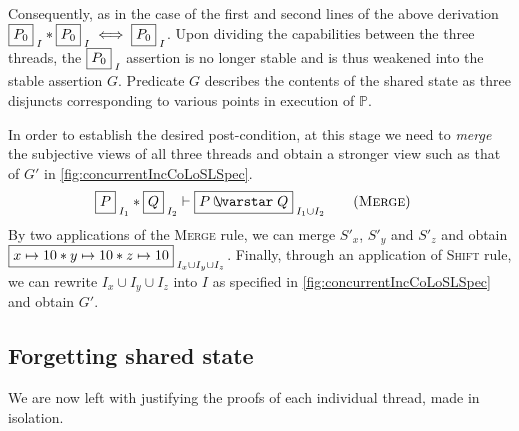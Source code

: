 Consequently, as in the case of the first and second lines of the
above derivation $\shared{P_0}{I} * \shared{P_0}{I} \iff
\shared{P_0}{I}$. Upon dividing the capabilities between the three
threads, the $\shared{P_0}{I}$ assertion is no longer stable and is
thus weakened into the stable assertion $G$. Predicate $G$ describes
the contents of the shared state as three disjuncts corresponding to
various points in execution of $\mathbb{P}$.


In order to establish the desired post-condition, at this stage we
need to \emph{merge} the subjective views of all three threads and
obtain a stronger view such as that of $G'$ in
\fig\ref{fig:concurrentIncCoLoSLSpec}.
\begin{align*}
  \label{eq:merge}
  \shared{P}{I_1} * \shared{Q}{I_2} &\vdash \shared{P \sepish Q}{I_1 \cup I_2} \tag{\textsc{Merge}}
\end{align*}
By two applications of the \textsc{Merge} rule, we can merge $S'_x$,
$S'_y$ and $S'_z$ and obtain $\shared{\cell{x}{10} * \cell{y}{10} *
  \cell{z}{10}}{I_x \cup I_y \cup I_z}$. Finally, through an
application of \textsc{Shift} rule, we can rewrite $I_x \cup I_y \cup
I_z$ into $I$ as specified in \fig\ref{fig:concurrentIncCoLoSLSpec}
and obtain $G'$.



\subsection{Forgetting shared state}
\label{subsec:hide}

We are now left with justifying the proofs of each individual thread,
made in isolation.

